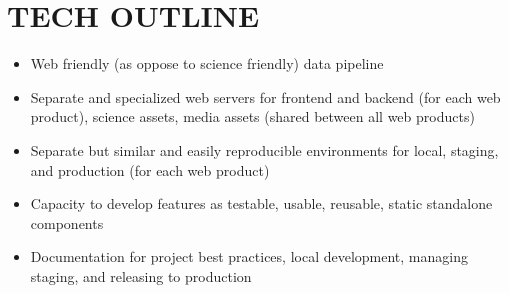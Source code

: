 \section{TECH OUTLINE}

\begin{itemize}
\item Web friendly (as oppose to science friendly) data pipeline
\item Separate and specialized web servers for frontend and backend (for each web product), science assets, media assets (shared between all web products)
\item Separate but similar and easily reproducible environments for local, staging, and production (for each web product)
\item Capacity to develop features as testable, usable, reusable, static standalone components
\item Documentation for project best practices, local development, managing staging, and releasing to production
\end{itemize}


